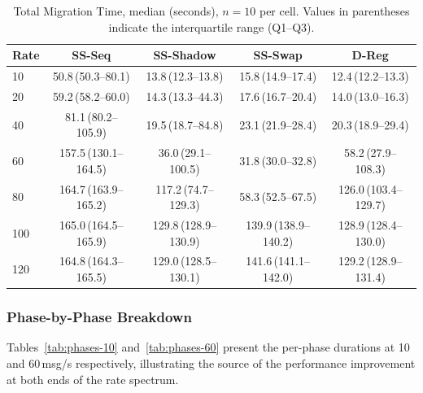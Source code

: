 \documentclass[conference]{IEEEtran}
\begin{document}
\begin{table}[t]
\centering
\caption{Total Migration Time, median (seconds), $n=10$ per cell. Values
in parentheses indicate the interquartile range (Q1--Q3).}
\label{tab:total-time}
\begin{tabular}{lcccc}
\toprule
\textbf{Rate} & \textbf{SS-Seq} & \textbf{SS-Shadow} & \textbf{SS-Swap} & \textbf{D-Reg} \\
\midrule
10  & 50.8\,\scriptsize(50.3--80.1) & 13.8\,\scriptsize(12.3--13.8) & 15.8\,\scriptsize(14.9--17.4) & 12.4\,\scriptsize(12.2--13.3) \\
20  & 59.2\,\scriptsize(58.2--60.0) & 14.3\,\scriptsize(13.3--44.3) & 17.6\,\scriptsize(16.7--20.4) & 14.0\,\scriptsize(13.0--16.3) \\
40  & 81.1\,\scriptsize(80.2--105.9) & 19.5\,\scriptsize(18.7--84.8) & 23.1\,\scriptsize(21.9--28.4) & 20.3\,\scriptsize(18.9--29.4) \\
60  & 157.5\,\scriptsize(130.1--164.5) & 36.0\,\scriptsize(29.1--100.5) & 31.8\,\scriptsize(30.0--32.8) & 58.2\,\scriptsize(27.9--108.3) \\
80  & 164.7\,\scriptsize(163.9--165.2) & 117.2\,\scriptsize(74.7--129.3) & 58.3\,\scriptsize(52.5--67.5) & 126.0\,\scriptsize(103.4--129.7) \\
100 & 165.0\,\scriptsize(164.5--165.9) & 129.8\,\scriptsize(128.9--130.9) & 139.9\,\scriptsize(138.9--140.2) & 128.9\,\scriptsize(128.4--130.0) \\
120 & 164.8\,\scriptsize(164.3--165.5) & 129.0\,\scriptsize(128.5--130.1) & 141.6\,\scriptsize(141.1--142.0) & 129.2\,\scriptsize(128.9--131.4) \\
\bottomrule
\end{tabular}
\end{table}


\subsubsection{Phase-by-Phase Breakdown}

Tables~\ref{tab:phases-10} and~\ref{tab:phases-60} present the per-phase
durations at 10 and 60\,msg/s respectively, illustrating the source of the
performance improvement at both ends of the rate spectrum.
\end{document}
